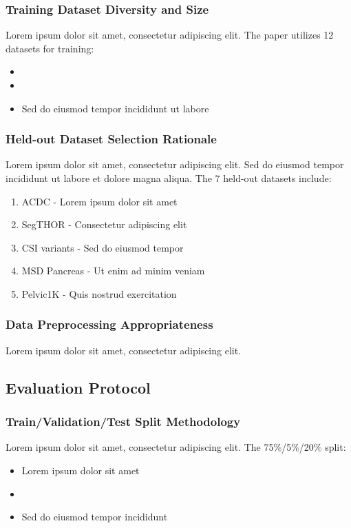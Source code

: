 \subsubsection{Training Dataset Diversity and Size}
Lorem ipsum dolor sit amet, consectetur adipiscing elit. The paper utilizes 12 datasets for training:



\begin{itemize}
    \item {}
    \item {}
    \item Sed do eiusmod tempor incididunt ut labore
\end{itemize}

\subsubsection{Held-out Dataset Selection Rationale}
Lorem ipsum dolor sit amet, consectetur adipiscing elit. Sed do eiusmod tempor incididunt ut labore et dolore magna aliqua. The 7 held-out datasets include:
\begin{enumerate}
    \item ACDC - Lorem ipsum dolor sit amet
    \item SegTHOR - Consectetur adipiscing elit
    \item CSI variants - Sed do eiusmod tempor
    \item MSD Pancreas - Ut enim ad minim veniam
    \item Pelvic1K - Quis nostrud exercitation
\end{enumerate}

\subsubsection{Data Preprocessing Appropriateness}
Lorem ipsum dolor sit amet, consectetur adipiscing elit. 

\subsection{Evaluation Protocol}
\subsubsection{Train/Validation/Test Split Methodology}
Lorem ipsum dolor sit amet, consectetur adipiscing elit. The 75\%/5\%/20\% split:
\begin{itemize}
    \item Lorem ipsum dolor sit amet
    \item {}
    \item Sed do eiusmod tempor incididunt
\end{itemize}

